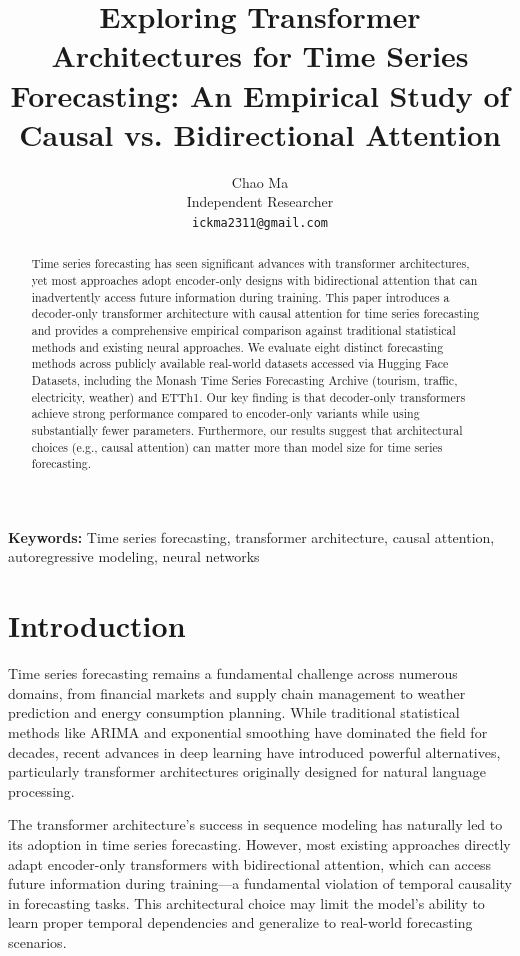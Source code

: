 \documentclass[11pt]{article}
\title{Exploring Transformer Architectures for Time Series Forecasting: An Empirical Study of Causal vs. Bidirectional Attention}
\author{Chao Ma\\
Independent Researcher\\
\texttt{ickma2311@gmail.com}
}
\date{}
\begin{document}
\maketitle

\begin{abstract}
Time series forecasting has seen significant advances with transformer architectures, yet most approaches adopt encoder-only designs with bidirectional attention that can inadvertently access future information during training. This paper introduces a decoder-only transformer architecture with causal attention for time series forecasting and provides a comprehensive empirical comparison against traditional statistical methods and existing neural approaches. We evaluate eight distinct forecasting methods across publicly available real-world datasets accessed via Hugging Face Datasets, including the Monash Time Series Forecasting Archive (tourism, traffic, electricity, weather) and ETTh1. Our key finding is that decoder-only transformers achieve strong performance compared to encoder-only variants while using substantially fewer parameters. Furthermore, our results suggest that architectural choices (e.g., causal attention) can matter more than model size for time series forecasting.
\end{abstract}

\noindent\textbf{Keywords:} Time series forecasting, transformer architecture, causal attention, autoregressive modeling, neural networks

\section{Introduction}

Time series forecasting remains a fundamental challenge across numerous domains, from financial markets and supply chain management to weather prediction and energy consumption planning. While traditional statistical methods like ARIMA and exponential smoothing have dominated the field for decades, recent advances in deep learning have introduced powerful alternatives, particularly transformer architectures originally designed for natural language processing.

The transformer architecture's success in sequence modeling has naturally led to its adoption in time series forecasting. However, most existing approaches directly adapt encoder-only transformers with bidirectional attention, which can access future information during training—a fundamental violation of temporal causality in forecasting tasks. This architectural choice may limit the model's ability to learn proper temporal dependencies and generalize to real-world forecasting scenarios.
\end{document}
